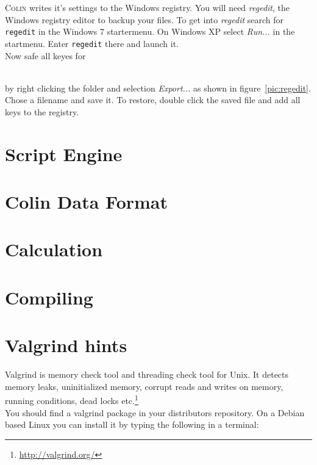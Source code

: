 \documentclass[a4paper,11pt]{report}
\newcommand{\Colin}[0]{\textsc{Colin }}
\begin{document}
\begin{minipage}[h]{0.5\textwidth+0.5cm}
\Colin writes it's settings to the Windows registry. You will need \textit{regedit}, the Windows registry editor to backup your files. To get into \textit{regedit} search for \texttt{regedit} in the Windows 7 startermenu. On Windows XP select \textit{Run...} in the startmenu. Enter \texttt{regedit} there and launch it.\\
Now safe all keyes for \begin{center}{\texttt{HKEY\_CURRENT\_USER/Software/clazzes.org/Colin}\end{center}\\
by right clicking the folder and selection \textit{Export...} as shown in figure~\ref{pic:regedit}. Chose a filename and save it. To restore, double click the saved file and add all keys to the registry.
\end{minipage}


\chapter{Script Engine}
\label{cha:scripting}


\chapter{Colin Data Format}
\label{cha:data}

\chapter{Calculation}
\label{cha:calculation}


\chapter{Compiling}
\label{cha:compile}

\chapter{Valgrind hints}
\label{cha:valgrind}
Valgrind is memory check tool and threading check tool for Unix. It detects memory leaks, uninitialized memory, corrupt reads and writes on memory, running conditions, dead locks etc.\footnote{\url{http://valgrind.org/}}\\
You should find a valgrind package in your distributors repository. On a Debian based Linux you can install it by typing the following in a terminal:
\end{document}
